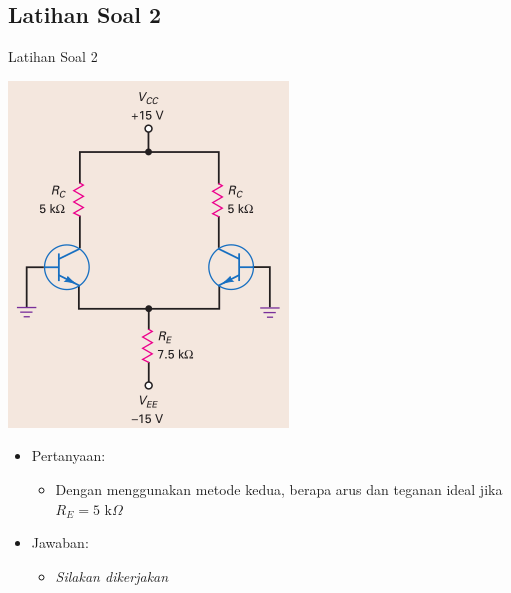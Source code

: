 \documentclass[aspectratio=169]{beamer}
\begin{document}
\subsection{Latihan Soal 2}
\begin{frame}{Latihan Soal 2}
	\begin{multicols}{2}
		\begin{center}
			\includegraphics[width=0.6\textheight]{gambar/01.diff-amp/01.latihan_soal_1a}
		\end{center}
		\columnbreak
		\begin{itemize}
			\item Pertanyaan:
			\begin{itemize}
				\item Dengan menggunakan metode kedua, berapa arus dan teganan ideal jika $ R_E = 5 \text{ k}\Omega $
			\end{itemize}
			\item Jawaban:
			\begin{itemize}
				\item \textit{Silakan dikerjakan}
			\end{itemize}
		\end{itemize}
		\vfill\null
	\end{multicols}
\end{frame}
\end{document}
